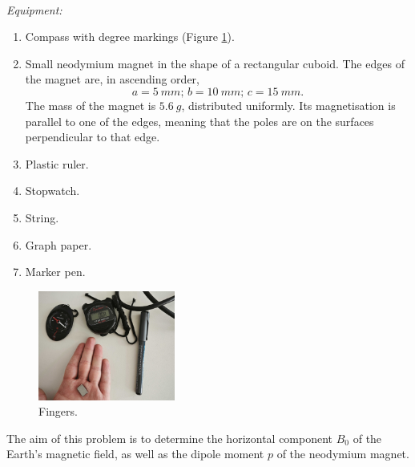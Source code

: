 \documentclass[../TST.tex]{subfiles}
\begin{document}
\begin{eproblem}{\ \\[5pt]}
\textit{Equipment:}
\begin{enumerate}[topsep=5pt, itemsep=0pt]
	\item[1.] Compass with degree markings (Figure \ref{fig1}).
	\item[2.] Small neodymium magnet in the shape of a rectangular cuboid. The edges of the magnet are, in ascending order,
		\begin{equation*}
		a=\qty{5}{mm};\,b=\qty{10}{mm};\,c=\qty{15}{mm}
		.
		\end{equation*}
	The mass of the magnet is $\qty{5.6}{g}$, distributed uniformly. Its magnetisation is parallel to one of the edges, meaning that the poles are on the surfaces perpendicular to that edge.
	\item[3.] Plastic ruler.
	\item[4.] Stopwatch.
	\item[5.] String.
	\item[6.] Graph paper.
	\item[7.] Marker pen.
\end{enumerate}

\begin{figure}[h]
\centering
\includegraphics[width=0.40\textwidth]{fig/2017_e11.jpg}
\caption{Fingers.}
\label{fig1}
\end{figure}

The aim of this problem is to determine the horizontal component $B_0$ of the Earth's magnetic field, as well as the dipole moment $p$ of the neodymium magnet.\\


\end{eproblem}
\end{document}
